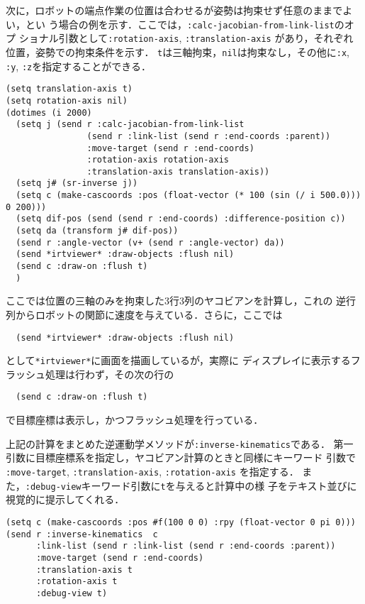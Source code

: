 次に，ロボットの端点作業の位置は合わせるが姿勢は拘束せず任意のままでよい，とい
う場合の例を示す．ここでは，\verb|:calc-jacobian-from-link-list|のオプ
ショナル引数として\verb|:rotation-axis|, \verb|:translation-axis|
があり，それぞれ位置，姿勢での拘束条件を示す．
\verb|t|は三軸拘束，\verb|nil|は拘束なし，その他に\verb|:x|,
\verb|:y|, \verb|:z|を指定することができる．

{\baselineskip=10pt
\begin{verbatim}
(setq translation-axis t)
(setq rotation-axis nil)
(dotimes (i 2000)
  (setq j (send r :calc-jacobian-from-link-list
                (send r :link-list (send r :end-coords :parent))
                :move-target (send r :end-coords)
                :rotation-axis rotation-axis
                :translation-axis translation-axis))
  (setq j# (sr-inverse j))
  (setq c (make-cascoords :pos (float-vector (* 100 (sin (/ i 500.0))) 0 200)))
  (setq dif-pos (send (send r :end-coords) :difference-position c))
  (setq da (transform j# dif-pos))
  (send r :angle-vector (v+ (send r :angle-vector) da))
  (send *irtviewer* :draw-objects :flush nil)
  (send c :draw-on :flush t)
  )
\end{verbatim}
}

ここでは位置の三軸のみを拘束した3行3列のヤコビアンを計算し，これの
逆行列からロボットの関節に速度を与えている．さらに，ここでは
{\baselineskip=10pt
\begin{verbatim}
  (send *irtviewer* :draw-objects :flush nil)
\end{verbatim}
}
として\verb|*irtviewer*|に画面を描画しているが，実際に
ディスプレイに表示するフラッシュ処理は行わず，その次の行の
{\baselineskip=10pt
\begin{verbatim}
  (send c :draw-on :flush t)
\end{verbatim}
}
で目標座標は表示し，かつフラッシュ処理を行っている．

上記の計算をまとめた逆運動学メソッドが\verb|:inverse-kinematics|である．
第一引数に目標座標系を指定し，ヤコビアン計算のときと同様にキーワード
引数で
\verb|:move-target|, \verb|:translation-axis|, \verb|:rotation-axis|
を指定する．
また，\verb|:debug-view|キーワード引数に\verb|t|を与えると計算中の様
子をテキスト並びに視覚的に提示してくれる．
{\baselineskip=10pt
\begin{verbatim}
(setq c (make-cascoords :pos #f(100 0 0) :rpy (float-vector 0 pi 0)))
(send r :inverse-kinematics  c
      :link-list (send r :link-list (send r :end-coords :parent))
      :move-target (send r :end-coords)
      :translation-axis t
      :rotation-axis t
      :debug-view t)
\end{verbatim}
}

